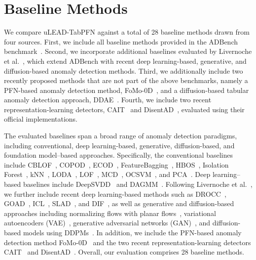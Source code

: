 \documentclass[conference]{IEEEtran}
\begin{document}
	\section{Baseline Methods}
	\label{app:baselines}
	We compare uLEAD-TabPFN against a total of 28 baseline methods drawn from four sources. First, we include all baseline methods provided in the ADBench benchmark~\cite{han2022adbench}. Second, we incorporate additional baselines evaluated by Livernoche et al.~\cite{livernochediffusion}, which extend ADBench with recent deep learning-based, generative, and diffusion-based anomaly detection methods.
	Third, we additionally include two recently proposed methods that are not part of the above benchmarks, namely a PFN-based anomaly detection method, FoMo-0D~\cite{fomo0d2024zeroshoot}, and a diffusion-based tabular anomaly detection approach, DDAE~\cite{sattarov2025diffusion}.
	Fourth, we include two recent representation-learning detectors, CAIT~\cite{mok2025cait} and DisentAD~\cite{ye2025disentad}, evaluated using their official implementations.

	The evaluated baselines span a broad range of anomaly detection paradigms, including conventional, deep learning-based, generative, diffusion-based, and foundation model--based approaches. Specifically, the conventional baselines include CBLOF~\cite{he2003cblof}, COPOD~\cite{li2020copod}, ECOD~\cite{li2022ecod}, FeatureBagging~\cite{lazarevic2005featurebagging}, HBOS~\cite{goldstein2012hbos}, Isolation Forest~\cite{liu2008iforest}, kNN~\cite{ramaswamy2000knn}, LODA~\cite{pevny2016loda}, LOF~\cite{breunig2000lof}, MCD~\cite{fauconnier2009mcd}, OCSVM~\cite{scholkopf1999ocsvm}, and PCA~\cite{shyu2003pca}. Deep learning--based baselines include DeepSVDD~\cite{ruff2018deepsvdd} and DAGMM~\cite{zong2018dagmm}. Following Livernoche et al.~\cite{livernochediffusion}, we further include recent deep learning-based methods such as DROCC~\cite{goyal2020drocc}, GOAD~\cite{bergman2020goad}, ICL~\cite{shenkar2022icl}, SLAD~\cite{xu2023slad}, and DIF~\cite{xu2023dif}, as well as generative and diffusion-based approaches including normalizing flows with planar flows~\cite{rezende2015planar}, variational autoencoders (VAE)~\cite{kingma2013vae}, generative adversarial networks (GAN)~\cite{goodfellow2014gan}, and diffusion-based models using DDPMs~\cite{livernochediffusion,sattarov2025diffusion}.
	In addition, we include the PFN-based anomaly detection method FoMo-0D~\cite{fomo0d2024zeroshoot} and the two recent representation-learning detectors CAIT~\cite{mok2025cait} and DisentAD~\cite{ye2025disentad}. Overall, our evaluation comprises 28 baseline methods.
\end{document}
